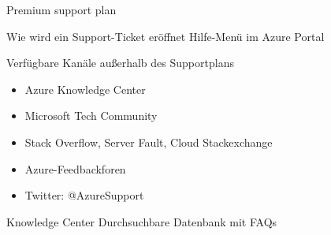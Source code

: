 \begin{flashcard}[Understand]{Premium support plan}

\end{flashcard}

\begin{flashcard}[\ ]{Wie wird ein Support-Ticket eröffnet}
    Hilfe-Menü im Azure Portal
\end{flashcard}

\begin{flashcard}[\ ]{Verfügbare Kanäle außerhalb des Supportplans}
    \begin{itemize}
        \item Azure Knowledge Center
        \item Microsoft Tech Community
        \item Stack Overflow, Server Fault, Cloud Stackexchange
        \item Azure-Feedbackforen
        \item Twitter: @AzureSupport
    \end{itemize}

\end{flashcard}

\begin{flashcard}[Describe]{Knowledge Center}
    Durchsuchbare Datenbank mit FAQs
\end{flashcard}
